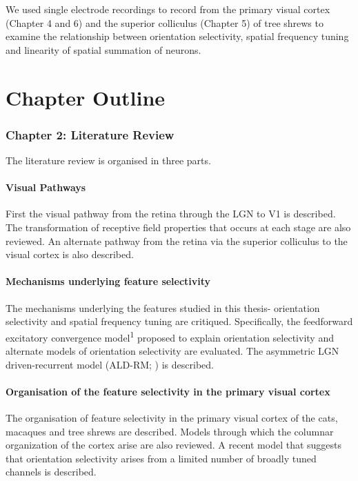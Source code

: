 We used single electrode recordings to record from the primary visual
cortex (Chapter 4 and 6) and the superior colliculus (Chapter 5) of tree
shrews to examine the relationship between orientation selectivity,
spatial frequency tuning and linearity of spatial summation of neurons.

\section{Chapter Outline}

\subsubsection{Chapter 2: Literature Review}


The literature review is organised in three parts.


\paragraph{Visual Pathways}

First the visual pathway from the retina through the LGN to V1 is
described. The transformation of receptive field properties that occurs
at each stage are also reviewed. An alternate pathway from the retina
via the superior colliculus to the visual cortex is also described.


\paragraph{Mechanisms underlying feature selectivity}

The mechanisms underlying the features studied in this thesis-
orientation selectivity and spatial frequency tuning are critiqued.
Specifically, the feedforward excitatory convergence
model\textsuperscript{1} proposed to explain orientation selectivity and
alternate models of orientation selectivity are evaluated. The
asymmetric LGN driven-recurrent model (ALD-RM; \cite{Vidyasagar1996c}) is described.


\paragraph{Organisation of the feature selectivity in the primary visual cortex}

The organisation of feature selectivity in the primary visual cortex of
the cats, macaques and tree shrews are described. Models through which
the columnar organization of the cortex arise are also reviewed. A
recent model that suggests that orientation selectivity arises from a
limited number of broadly tuned channels is described.



